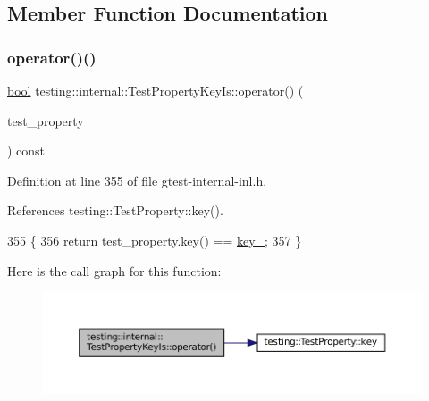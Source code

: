 \subsection{Member Function Documentation}
\mbox{\label{classtesting_1_1internal_1_1TestPropertyKeyIs_abf5eb5bf22065e0614ffe36d093e885e}} 
\subsubsection{\texorpdfstring{operator()()}{operator()()}}
{\footnotesize\ttfamily \hyperlink{classbool}{bool} testing\+::internal\+::\+Test\+Property\+Key\+Is\+::operator() (\begin{DoxyParamCaption}\item[{const \hyperlink{classtesting_1_1TestProperty}{Test\+Property} \&}]{test\+\_\+property }\end{DoxyParamCaption}) const\hspace{0.3cm}{\ttfamily [inline]}}



Definition at line 355 of file gtest-\/internal-\/inl.\+h.



References testing\+::\+Test\+Property\+::key().


\begin{DoxyCode}
355                                                            \{
356     \textcolor{keywordflow}{return} test\_property.key() == \hyperlink{classtesting_1_1internal_1_1TestPropertyKeyIs_a857f42b8753df8efccc8f38196b150b9}{key\_};
357   \}
\end{DoxyCode}
Here is the call graph for this function\+:
\nopagebreak
\begin{figure}[H]
\begin{center}
\leavevmode
\includegraphics[width=350pt]{classtesting_1_1internal_1_1TestPropertyKeyIs_abf5eb5bf22065e0614ffe36d093e885e_cgraph}
\end{center}
\end{figure}


